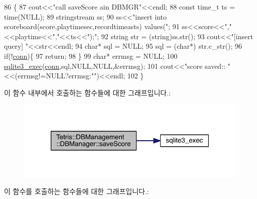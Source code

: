 \begin{DoxyCode}
86                                                                                 \{
87                 cout<<\textcolor{stringliteral}{"call saveScore ain DBMGR"}<<endl;
88                 \textcolor{keyword}{const} time\_t ts = time(NULL);
89                 stringstream ss;
90                 ss<<\textcolor{stringliteral}{"insert into scoreboard(score,playtimesec,recordtimeasts) values("};
91                 ss<<score<<\textcolor{stringliteral}{","}<<playtime<<\textcolor{stringliteral}{","}<<ts<<\textcolor{stringliteral}{");"};
92                 \textcolor{keywordtype}{string} str = (string)ss.str();
93                 cout<<\textcolor{stringliteral}{"[insert query] "}<<str<<endl;
94                 \textcolor{keywordtype}{char}* sql = NULL;
95                 sql = (\textcolor{keywordtype}{char}*) str.c\_str();
96                 \textcolor{keywordflow}{if}(!\hyperlink{class_tetris_1_1_d_b_management_1_1_d_b_manager_acc2c19420c2b1b1b2c1e724b3a8ec4b7}{conn})\{
97                     \textcolor{keywordflow}{return};
98                 \}
99                 \textcolor{keywordtype}{char}* errmsg = NULL;
100                 \hyperlink{sqlite3_8h_a97487ec8150e0bcc8fa392ab8f0e24db}{sqlite3\_exec}(\hyperlink{class_tetris_1_1_d_b_management_1_1_d_b_manager_acc2c19420c2b1b1b2c1e724b3a8ec4b7}{conn},sql,NULL,NULL,&errmsg);
101                 cout<<\textcolor{stringliteral}{"score saved:: "}<<(errmsg!=NULL?errmsg:\textcolor{stringliteral}{""})<<endl;
102             \}
\end{DoxyCode}
이 함수 내부에서 호출하는 함수들에 대한 그래프입니다.\+:
\nopagebreak
\begin{figure}[H]
\begin{center}
\leavevmode
\includegraphics[width=316pt]{da/d79/class_tetris_1_1_d_b_management_1_1_d_b_manager_aef16da1d2e564caa309bfc3b3e419d7e_cgraph}
\end{center}
\end{figure}
이 함수를 호출하는 함수들에 대한 그래프입니다.\+:
\nopagebreak
